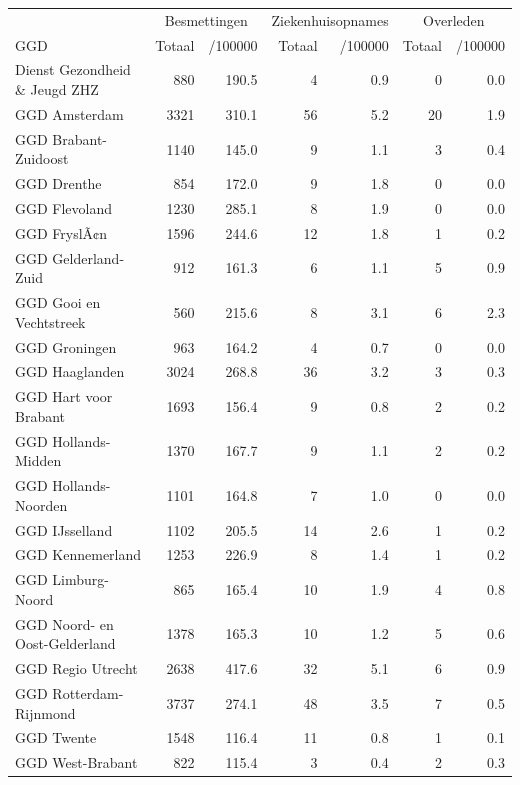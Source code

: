 \documentclass[
  english,
  man,floatsintext]{apa6}
\begin{document}
\begin{table}
\centering\begingroup\fontsize{10}{12}\selectfont

\begin{threeparttable}
\begin{tabular}{lrrrrrr}
\toprule
\multicolumn{1}{c}{ } & \multicolumn{2}{c}{Besmettingen} & \multicolumn{2}{c}{Ziekenhuisopnames} & \multicolumn{2}{c}{Overleden} \\
\cmidrule(l{3pt}r{3pt}){2-3} \cmidrule(l{3pt}r{3pt}){4-5} \cmidrule(l{3pt}r{3pt}){6-7}
GGD & Totaal & /100000 & Totaal & /100000 & Totaal & /100000\\
\midrule
Dienst Gezondheid \& Jeugd ZHZ & 880 & 190.5 & 4 & 0.9 & 0 & 0.0\\
GGD Amsterdam & 3321 & 310.1 & 56 & 5.2 & 20 & 1.9\\
GGD Brabant-Zuidoost & 1140 & 145.0 & 9 & 1.1 & 3 & 0.4\\
GGD Drenthe & 854 & 172.0 & 9 & 1.8 & 0 & 0.0\\
GGD Flevoland & 1230 & 285.1 & 8 & 1.9 & 0 & 0.0\\
GGD FryslÃ¢n & 1596 & 244.6 & 12 & 1.8 & 1 & 0.2\\
GGD Gelderland-Zuid & 912 & 161.3 & 6 & 1.1 & 5 & 0.9\\
GGD Gooi en Vechtstreek & 560 & 215.6 & 8 & 3.1 & 6 & 2.3\\
GGD Groningen & 963 & 164.2 & 4 & 0.7 & 0 & 0.0\\
GGD Haaglanden & 3024 & 268.8 & 36 & 3.2 & 3 & 0.3\\
GGD Hart voor Brabant & 1693 & 156.4 & 9 & 0.8 & 2 & 0.2\\
GGD Hollands-Midden & 1370 & 167.7 & 9 & 1.1 & 2 & 0.2\\
GGD Hollands-Noorden & 1101 & 164.8 & 7 & 1.0 & 0 & 0.0\\
GGD IJsselland & 1102 & 205.5 & 14 & 2.6 & 1 & 0.2\\
GGD Kennemerland & 1253 & 226.9 & 8 & 1.4 & 1 & 0.2\\
GGD Limburg-Noord & 865 & 165.4 & 10 & 1.9 & 4 & 0.8\\
GGD Noord- en Oost-Gelderland & 1378 & 165.3 & 10 & 1.2 & 5 & 0.6\\
GGD Regio Utrecht & 2638 & 417.6 & 32 & 5.1 & 6 & 0.9\\
GGD Rotterdam-Rijnmond & 3737 & 274.1 & 48 & 3.5 & 7 & 0.5\\
GGD Twente & 1548 & 116.4 & 11 & 0.8 & 1 & 0.1\\
GGD West-Brabant & 822 & 115.4 & 3 & 0.4 & 2 & 0.3\\

\end{tabular}
\end{threeparttable}
\end{table}
\end{document}
